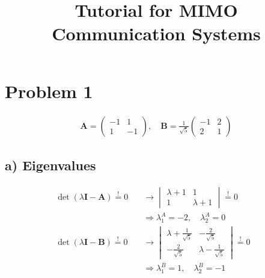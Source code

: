\documentclass[fleqn]{article}
\begin{document}
\begin{titlepage}
\title{Tutorial for MIMO Communication Systems}
\end{titlepage}
\maketitle

\section*{Problem 1}
\begin{align*}
	\mathbf{A} = 
	\begin{pmatrix}
	-1 & 1 \\
	1 & -1
	\end{pmatrix}
	,\quad
	\mathbf{B} = \frac{1}{\sqrt{5}}
	\begin{pmatrix}
	-1 & 2 \\
	2 & 1
	\end{pmatrix}
\end{align*}

\subsection*{a) Eigenvalues}
\begin{align*}
	\det\left(\lambda\mathbf{I-A}\right)\overset{!}{=}0
	\quad&\rightarrow
	\begin{vmatrix}
	\lambda+1 & 1 \\
	1 & \lambda +1
	\end{vmatrix}
	\overset{!}{=}0& \\
	&\Rightarrow\lambda_{1}^{A}=-2,\quad\lambda_{2}^{A}=0& \\
	\det\left(\lambda\mathbf{I-B}\right)\overset{!}{=}0
	\quad&\rightarrow
	\begin{vmatrix}
	\lambda+\frac{1}{\sqrt{5}} & -\frac{2}{\sqrt{5}} \\
	-\frac{2}{\sqrt{5}} & \lambda-\frac{1}{\sqrt{5}}
	\end{vmatrix}
	\overset{!}{=}0& \\
	&\Rightarrow\lambda_{1}^{B}=1,\quad\lambda_{2}^{B}=-1&
\end{align*}
\end{document}
